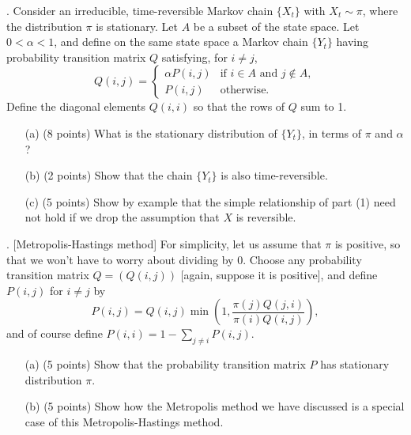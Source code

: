 \documentclass{article}
\begin{document}
\bigskip

. Consider an irreducible, time-reversible Markov chain $\{X_t\}$ with $X_t \sim \pi$, where the distribution $\pi$ is stationary. Let $A$ be a subset of the state space. Let $0 < \alpha < 1$, and define on the same state space a Markov chain $\{Y_t\}$ having probability transition matrix $Q$ satisfying, for $i \neq j$,
\[
Q(i,j) =
\begin{cases}
\alpha P(i,j) & \text{if } i \in A \text{ and } j \notin A, \\
P(i,j) & \text{otherwise}.
\end{cases}
\]
Define the diagonal elements $Q(i,i)$ so that the rows of $Q$ sum to 1.
\begin{itemize}
    \item[(a)] (8 points) What is the stationary distribution of $\{Y_t\}$, in terms of $\pi$ and $\alpha$?

    \textcolor{blue}{}

    \item[(b)] (2 points) Show that the chain $\{Y_t\}$ is also time-reversible.

    \textcolor{blue}{}


    \item[(c)] (5 points) Show by example that the simple relationship of part (1) need not hold if we drop the assumption that $X$ is reversible.

    \textcolor{blue}{}

\end{itemize}

\bigskip

. [Metropolis-Hastings method] For simplicity, let us assume that $\pi$ is positive, so that we won’t have to worry about dividing by 0. Choose any probability transition matrix $Q = (Q(i,j))$ [again, suppose it is positive], and define $P(i,j)$ for $i \neq j$ by
\[
P(i,j) = Q(i,j) \min \left( 1, \frac{\pi(j)Q(j,i)}{\pi(i)Q(i,j)} \right),
\]
and of course define $P(i,i) = 1 - \sum_{j \neq i} P(i,j)$. 

\begin{itemize}

    \item[(a)] (5 points) Show that the probability transition matrix $P$ has stationary distribution $\pi$. 

    \textcolor{blue}{}

    \item[(b)] (5 points) Show how the Metropolis method we have discussed is a special case of this Metropolis-Hastings method.

    \textcolor{blue}{}

\end{itemize}
\end{document}
